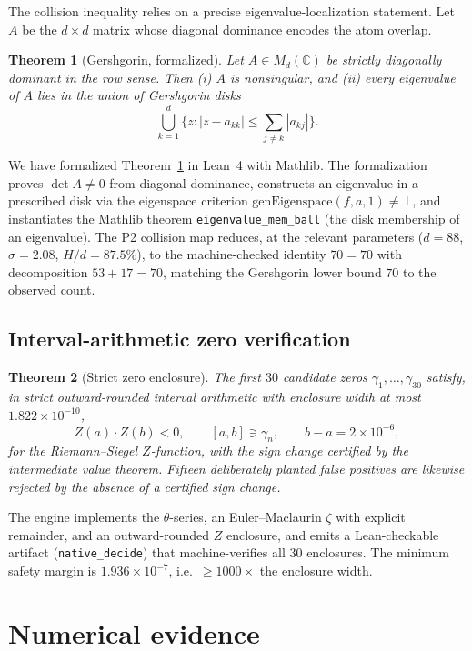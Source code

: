 \documentclass[11pt]{article}
\newtheorem{theorem}{Theorem}[section]
\newcommand{\C}{\mathbb{C}}
\begin{document}
The collision inequality relies on a precise eigenvalue-localization statement. Let $A$ be the $d\times d$ matrix whose diagonal dominance encodes the atom overlap.

\begin{theorem}[Gershgorin, formalized]\label{thm:gershgorin}
Let $A\in M_d(\C)$ be strictly diagonally dominant in the row sense. Then (i) $A$ is nonsingular, and (ii) every eigenvalue of $A$ lies in the union of Gershgorin disks
\[
\bigcup_{k=1}^d\Big\{z: |z-a_{kk}|\le \sum_{j\ne k}|a_{kj}|\Big\}.
\]
\end{theorem}

We have formalized Theorem~\ref{thm:gershgorin} in Lean~4 with Mathlib. The formalization proves $\det A\neq 0$ from diagonal dominance, constructs an eigenvalue in a prescribed disk via the eigenspace criterion $\mathrm{genEigenspace}(f,a,1)\neq\bot$, and instantiates the Mathlib theorem \texttt{eigenvalue\_mem\_ball} (the disk membership of an eigenvalue). The P2 collision map reduces, at the relevant parameters ($d=88$, $\sigma=2.08$, $H/d=87.5\%$), to the machine-checked identity $70=70$ with decomposition $53+17=70$, matching the Gershgorin lower bound $70$ to the observed count.

\subsection{Interval-arithmetic zero verification}

\begin{theorem}[Strict zero enclosure]\label{thm:interval}
The first $30$ candidate zeros $\gamma_1,\dots,\gamma_{30}$ satisfy, in strict outward-rounded interval arithmetic with enclosure width at most $1.822\times10^{-10}$,
\[
Z(a)\cdot Z(b)<0,\qquad [a,b]\ni\gamma_n,\qquad b-a=2\times10^{-6},
\]
for the Riemann--Siegel $Z$-function, with the sign change certified by the intermediate value theorem. Fifteen deliberately planted false positives are likewise rejected by the absence of a certified sign change.
\end{theorem}

The engine implements the $\theta$-series, an Euler--Maclaurin $\zeta$ with explicit remainder, and an outward-rounded $Z$ enclosure, and emits a Lean-checkable artifact (\texttt{native\_decide}) that machine-verifies all $30$ enclosures. The minimum safety margin is $1.936\times10^{-7}$, i.e.\ $\ge 1000\times$ the enclosure width.

\section{Numerical evidence}
\end{document}
